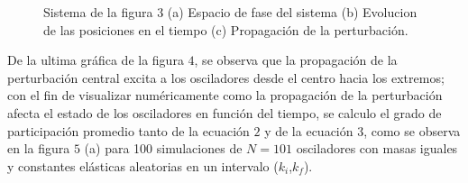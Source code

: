 \documentclass[11pt,letterpaper,twocolumn]{article}
\begin{document}
\begin{figure}[h!]
\begin{center}
\caption{Sistema de la figura $3$ (a) Espacio de fase del sistema (b) Evolucion de las posiciones en el tiempo (c) Propagación de la perturbación.}
\end{center}
\end{figure}
\par 
De la ultima gráfica de la figura $4$, se observa que la propagación de la perturbación central excita a los osciladores desde el centro hacia los extremos; con el fin de visualizar numéricamente como la propagación de la perturbación afecta el estado de los osciladores en función del tiempo, se calculo el grado de participación promedio tanto de la ecuación $2$ y de la ecuación $3$, como se observa en la figura $5$ (a) para 100 simulaciones de $N=101$ osciladores con masas iguales y constantes elásticas aleatorias en un intervalo ($k_{i}$,$k_{f}$).\\
\end{document}
